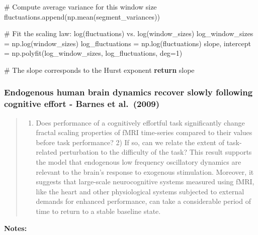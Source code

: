 \documentclass[
  sn-vancouver,
  Numbered,
  referee,
  lineno]{sn-jnl}
\newenvironment{Shaded}{\begin{snugshade}}{\end{snugshade}}
\newcommand{\CommentTok}[1]{\textcolor[rgb]{0.37,0.37,0.37}{#1}}
\newcommand{\ControlFlowTok}[1]{\textcolor[rgb]{0.00,0.23,0.31}{\textbf{#1}}}
\newcommand{\DecValTok}[1]{\textcolor[rgb]{0.68,0.00,0.00}{#1}}
\newcommand{\NormalTok}[1]{\textcolor[rgb]{0.00,0.23,0.31}{#1}}
\newcommand{\OperatorTok}[1]{\textcolor[rgb]{0.37,0.37,0.37}{#1}}
\providecommand{\tightlist}{%
  \setlength{\itemsep}{0pt}\setlength{\parskip}{0pt}}\usepackage{longtable,booktabs,array}
\begin{document}
\begin{Shaded}
\begin{Highlighting}[]
        \CommentTok{\# Compute average variance for this window size}
\NormalTok{        fluctuations.append(np.mean(segment\_variances))}

    \CommentTok{\# Fit the scaling law: log(fluctuations) vs. log(window\_sizes)}
\NormalTok{    log\_window\_sizes }\OperatorTok{=}\NormalTok{ np.log(window\_sizes)}
\NormalTok{    log\_fluctuations }\OperatorTok{=}\NormalTok{ np.log(fluctuations)}
\NormalTok{    slope, intercept }\OperatorTok{=}\NormalTok{ np.polyfit(log\_window\_sizes, log\_fluctuations, deg}\OperatorTok{=}\DecValTok{1}\NormalTok{)}
    
    \CommentTok{\# The slope corresponds to the Hurst exponent}
    \ControlFlowTok{return}\NormalTok{ slope}
\end{Highlighting}
\end{Shaded}

\subsubsection{\texorpdfstring{Endogenous human brain dynamics recover
slowly following cognitive effort - Barnes et al.~(2009)
\citep{barnesEndogenousHumanBrain2009}}{Endogenous human brain dynamics recover slowly following cognitive effort - Barnes et al.~(2009) {[}@barnesEndogenousHumanBrain2009{]}}}\label{endogenous-human-brain-dynamics-recover-slowly-following-cognitive-effort---barnes-et-al.-2009-barnesendogenoushumanbrain2009}

\begin{quote}
\begin{enumerate}
\def\labelenumi{\arabic{enumi})}
\tightlist
\item
  Does performance of a cognitively effortful task significantly change
  fractal scaling properties of fMRI time-series compared to their
  values before task performance? 2) If so, can we relate the extent of
  task-related perturbation to the difficulty of the task? This result
  supports the model that endogenous low frequency oscillatory dynamics
  are relevant to the brain's response to exogenous stimulation.
  Moreover, it suggests that large-scale neurocognitive systems measured
  using fMRI, like the heart and other physiological systems subjected
  to external demands for enhanced performance, can take a considerable
  period of time to return to a stable baseline state.
\end{enumerate}
\end{quote}

\textbf{Notes:}
\end{document}
